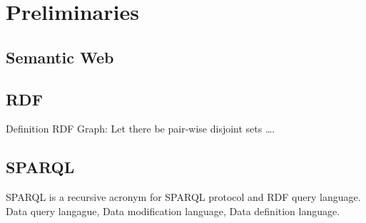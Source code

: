 \chapter{Preliminaries}
\label{sec:preliminaries}

\section{Semantic Web}

\section{RDF}
Definition RDF Graph: Let there be pair-wise disjoint sets \ldots.

\section{SPARQL}
SPARQL is a recursive acronym for SPARQL protocol and RDF query language.
Data query langague, Data modification language, Data definition language.
